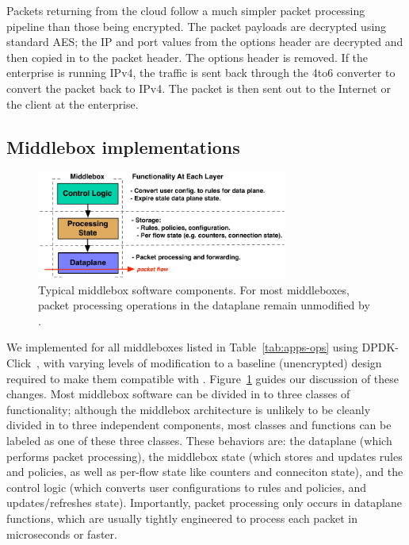  Packets returning from the cloud follow a much simpler packet processing pipeline than those being encrypted.
The packet payloads are decrypted using standard AES; the IP and port values from the options header are decrypted and then copied in to the packet header. The options header is removed.
If the enterprise is running IPv4, the traffic is sent back through the 4to6 converter to convert the packet back to IPv4.
The packet is then sent out to the Internet or the client at the enterprise.


\subsection{Middlebox implementations}
\label{sec:middleboxes}

\begin{figure}[t]
  \includegraphics[width=3.25in]{fig/mbarch}
  \caption[]{\label{fig:mbarch} Typical middlebox software components. For most middleboxes, packet processing operations in the dataplane remain unmodified by \sys.}
\end{figure}

We implemented \sys for all middleboxes listed in Table~\ref{tab:apps-ops} using DPDK-Click~\cite{dpdk-click}, with varying levels of modification to a baseline (unencrypted) design required to make them compatible with \sys. 
Figure~\ref{fig:mbarch} guides our discussion of these changes. Most middlebox software can be divided in to three classes of functionality;
although the middlebox architecture is unlikely to be cleanly divided in to three independent components, most classes and functions can be labeled as one of these three classes.
These behaviors are: the dataplane (which performs packet processing), the middlebox state (which stores and updates rules and policies, as well as per-flow state like counters and conneciton state), and the control logic (which converts user configurations to rules and policies, and updates/refreshes state). 
Importantly, packet processing only occurs in dataplane functions, which are usually tightly engineered to process each packet in microseconds or faster.

